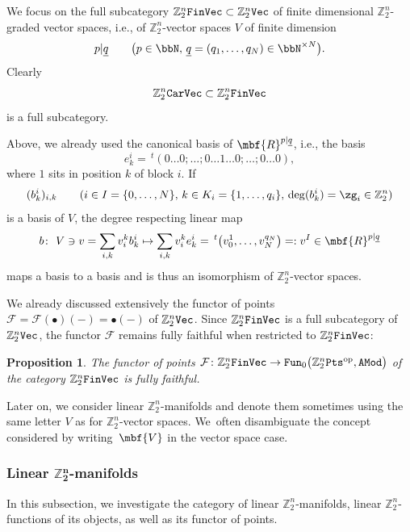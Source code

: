 \documentclass[pdftex]{sigma}%
\newcommand{\op}[1]{\operatorname{#1}}
\newcommand{\Z}{{\mathbb Z}}
\def\ul{\underline}
\def\cF{\mathcal{F}}
\def\ul{\underline}
\newcommand{\0}{\otimes}
\newcommand{\z}{\Z_2^n}
\numberwithin{equation}{section}
\newtheorem{Proposition}[Theorem]{Proposition}
 { \theoremstyle{definition}
\newtheorem{Definition}[Theorem]{Definition}
\newtheorem{Example}[Theorem]{Example}
\newtheorem{Remark}[Theorem]{Remark} }
\begin{document}
We focus on the full subcategory $\Z_2^n{\tt FinVec}\subset\Z_2^n\tt Vec$ of finite dimensional $\Z_2^n$-graded vector spaces, i.e., of $\Z_2^n$-vector spaces $V$ of finite dimension
\[
p|\ul q\qquad \big(p\in\bbN,\, \ul{q}=(q_1,\dots,q_N)\in\bbN^{\times N}\big).
\]
Clearly
\[
\Z_2^n{\tt CarVec}\subset\Z_2^n \tt FinVec
\]
is a full subcategory.

Above, we already used the canonical basis of $\mbf{R}^{p|\ul q}$, i.e., the basis
\[
e^i_k=\,^t(0\dots 0;\dots;0\dots 1\dots 0;\dots;0\dots 0),
\]
where $1$ sits in position $k$ of block $i$. If
\[
(b^i_k)_{i,k}\qquad (i\in I=\{0,\dots,N\},\, k\in K_i=\{1,\dots,q_i\},\, \deg(b^i_k)=\zg_i\in\Z_2^n)
\]
is a basis of $V$, the degree respecting linear map
\begin{gather*}%
b\colon\ V\ni v=\sum_{i,k}v^k_ib^i_k\mapsto \sum_{i,k}v^k_ie^i_k=\,^t\big(v_0^1,\dots,v_N^{q_N}\big)=:v^I\in\mbf{R}^{p|\ul q}
\end{gather*}
maps a basis to a basis and is thus an isomorphism of $\Z_2^n$-vector spaces.

We already discussed extensively the functor of points $\cF= \cF(\bullet)(-)=\bullet(-)$ of $\z\tt Vec$. Since $\z\tt FinVec$ is a full subcategory of $\z\tt Vec$, the functor $\cF$ remains fully faithful when restricted to $\z\tt FinVec$:

\begin{Proposition}\label{FunPtsFinVecFF}
The functor of points $\cF\colon \z{\tt FinVec}\to{\tt Fun}_0\big(\z{\tt Pts}^{\op{op}},{\tt AMod}\big)$ of the category $\z{\tt FinVec}$ is fully faithful.
\end{Proposition}

\begin{Remark} Later on, we consider linear $\Z_2^n$-manifolds and denote them sometimes using the same letter $V$ as for $\Z_2^n$-vector spaces. We~often disambiguate the concept considered by writing~$\mbf{V}$ in the vector space case.
\end{Remark}

\newcommand{\sfl}{\textsf{L}}

\subsubsection[Linear Z2n-manifolds]{Linear $\boldsymbol{\Z_2^n}$-manifolds}

In this subsection, we investigate the category of linear $\z$-manifolds, linear $\z$-functions of its objects, as well as its functor of points.
\end{document}
